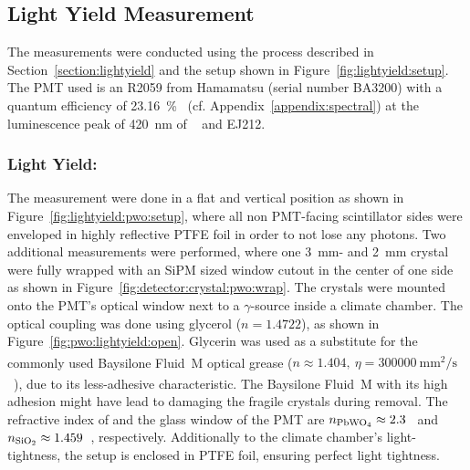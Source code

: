 \subsection{Light Yield Measurement}
The measurements were conducted using the process described in Section~\ref{section:lightyield} and the setup shown in Figure~\ref{fig:lightyield:setup}.
The PMT used is an R2059 from Hamamatsu (serial number BA3200) with a quantum efficiency of \SI{23.16}{\percent}~\cite{datasheet:hamamatsu_R2059} (cf. Appendix~\ref{appendix:spectral}) at the luminescence peak of \SI{420}{\nano\meter} of ~\cite{cms:tdr} and EJ212.

\subsubsection{Light Yield: }
The  measurement were done in a flat and vertical position as shown in Figure~\ref{fig:lightyield:pwo:setup}, where all non PMT-facing scintillator sides were enveloped in highly reflective PTFE foil in order to not lose any photons.
Two additional measurements were performed, where one \SI{3}{\milli\meter}- and \SI{2}{\milli\meter} crystal were fully wrapped with an SiPM sized window cutout in the center of one side  as shown in Figure~\ref{fig:detector:crystal:pwo:wrap}.
The  crystals were mounted onto the PMT's optical window next to a  $\gamma$-source inside a climate chamber.
The optical coupling was done using glycerol ($n=1.4722$), as shown in Figure~\ref{fig:pwo:lightyield:open}.
Glycerin was used as a substitute for the commonly used Baysilone\textsuperscript{{\textregistered}} Fluid~M optical grease ($n\approx 1.404,~\eta=\SI{300000}{\milli\meter^2\per\second}$~\cite{bayer:baysilone}), due to its less-adhesive characteristic.
The Baysilone\textsuperscript{{\textregistered}} Fluid~M with its high adhesion might have lead to damaging the fragile crystals during removal.
The refractive index of  and the  glass window of the \gls{PMT} are $n_{\ce{PbWO4}}\approx2.3$~\cite{cms:tdr} and $n_{\ce{SiO2}}\approx1.459$~\cite{Malitson:65}, respectively.
Additionally to the climate chamber's light-tightness, the setup is enclosed in PTFE foil, ensuring perfect light tightness.

